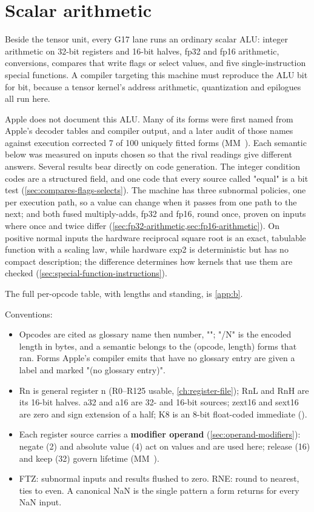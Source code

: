 \chapter{Scalar arithmetic}\label{ch:scalar-arithmetic}

Beside the tensor unit, every G17 lane runs an ordinary scalar ALU: integer arithmetic on 32-bit
registers and 16-bit halves, fp32 and fp16 arithmetic, conversions, compares that write flags or select values, and five
single-instruction special functions. A compiler targeting this machine must reproduce the ALU bit for bit, because a
tensor kernel's address arithmetic, quantization and epilogues all run here.

Apple does not document this ALU. Many of its forms were first named from Apple's decoder
tables and compiler output, and a later audit of those names against execution corrected 7 of 100 uniquely fitted forms
(MM~). Each semantic below was measured on inputs chosen so that the rival readings give different answers.
Several results bear directly on code generation. The integer condition codes are a structured field, and one code
that every source called "equal" is a bit test (\cref{sec:compares-flags-selects}). The machine has three subnormal
policies, one per execution path, so a value can change when it passes from one path to the next; and both fused
multiply-adds, fp32 and fp16, round once, proven on inputs where once and twice differ
(\cref{sec:fp32-arithmetic,sec:fp16-arithmetic}). On positive normal inputs the hardware reciprocal
square root is an exact, tabulable function with a scaling law, while hardware exp2 is deterministic but has no compact
description; the difference determines how kernels that use them are checked (\cref{sec:special-function-instructions}).

The full per-opcode table, with lengths and standing, is \cref{app:b}.

Conventions:

\begin{itemize}
\item Opcodes are cited as glossary name then number, ""; "/N" is the encoded length in bytes, and a
  semantic belongs to the (opcode, length) forms that ran. Forms Apple's compiler emits that have no glossary entry are
  given a label and marked "(no glossary entry)".
\item Rn is general register n (R0–R125 usable, \cref{ch:register-file}); RnL and RnH are its 16-bit halves. a32 and a16 are 32- and
  16-bit sources; zext16 and sext16 are zero and sign extension of a half; K8 is an 8-bit float-coded immediate
  ().
\item Each register source carries a \textbf{modifier operand} (\cref{sec:operand-modifiers}): negate (2) and absolute value (4) act on values and
  are used here; release (16) and keep (32) govern lifetime (MM~).
\item FTZ: subnormal inputs and results flushed to zero. RNE: round to nearest, ties to even. A canonical NaN is the single
  pattern a form returns for every NaN input.
\end{itemize}

